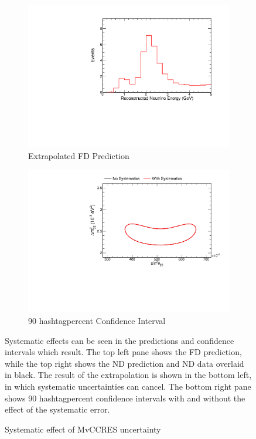 {\begin{figure}
\begin{center}
\begin{subfigure}[c]{0.49\textwidth}
\includegraphics[width=\textwidth]{figures/systs/prediction/fd_extrap_prediction_MvCCRES.pdf}
\caption*{Extrapolated FD Prediction}
\end{subfigure}
\begin{subfigure}[c]{0.49\textwidth}
\includegraphics[width=\textwidth]{figures/systs/prediction/fd_extrap_contour_MvCCRES.pdf}
\caption*{90 hashtagpercent Confidence Interval}
\end{subfigure}
\end{center}
\caption{Systematic effect of MvCCRES uncertainty}{
Systematic effects can be seen in the predictions and confidence intervals
which result.
The top left pane shows the FD prediction, while the top right shows the
ND prediction and ND data overlaid in black.
The result of the extrapolation is shown in the bottom left, in which
systematic uncertainties can cancel.
The bottom right pane shows 90 hashtagpercent confidence intervals with and without
the effect of the systematic error.}
\label{syst_fig_MvCCRES}


\end{figure}}
